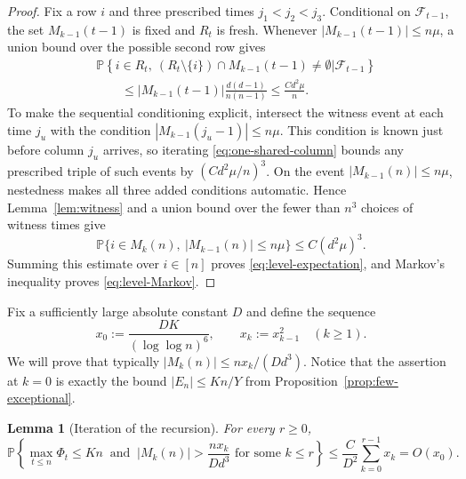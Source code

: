 \documentclass[reqno,english]{amsart}
\newcommand*{\PP}{\mathbb P}
\newcommand*{\calF}{\mathcal F}
\newtheorem{lemma}[lemma]{Lemma}
\theoremstyle{definition}
\begin{document}
\begin{proof}
Fix a row $i$ and three prescribed times $j_1<j_2<j_3$.  Conditional on
$\calF_{t-1}$, the set $M_{k-1}(t-1)$ is fixed and $R_t$ is fresh.  Whenever
$|M_{k-1}(t-1)|\le n\mu$, a union bound over the possible second row gives
\begin{align}\label{eq:one-shared-column}
 &\PP\left\{i\in R_t,\
   (R_t\setminus\{i\})\cap M_{k-1}(t-1)\ne\emptyset
   \mathrel{\Big|}\calF_{t-1}\right\}\nonumber\\
 &\qquad\le |M_{k-1}(t-1)|\frac{d(d-1)}{n(n-1)}
 \le\frac{Cd^2\mu}{n}.
\end{align}
To make the sequential conditioning explicit, intersect the witness event at
each time $j_u$ with the condition
$|M_{k-1}(j_u-1)|\le n\mu$.  This condition is known just before column
$j_u$ arrives, so iterating \eqref{eq:one-shared-column} bounds any prescribed
triple of such events by $(Cd^2\mu/n)^3$.  On the event
$|M_{k-1}(n)|\le n\mu$, nestedness makes all three added conditions automatic.
Hence Lemma~\ref{lem:witness} and a union bound over the fewer than $n^3$ choices
of witness times give
\begin{equation}\label{eq:single-row-level}
 \PP\{i\in M_k(n),\ |M_{k-1}(n)|\le n\mu\}
 \le C(d^2\mu)^3.
\end{equation}
Summing this estimate over $i\in[n]$ proves
\eqref{eq:level-expectation}, and Markov's inequality proves
\eqref{eq:level-Markov}.
\end{proof}

Fix a sufficiently large absolute constant $D$ and define {\color{black}the} sequence
\begin{equation}\label{eq:x-recursion}
 x_0:=\frac{DK}{(\log\log n)^6},
 \qquad
 x_k:=x_{k-1}^2\quad(k\ge1).
\end{equation}
We will prove that typically $|M_k(n)|\le n x_k/(Dd^3)$.  Notice that the assertion at
$k=0$ is exactly the bound $|E_n|\le Kn/Y$ from
Proposition~\ref{prop:few-exceptional}.

\begin{lemma}[Iteration of the recursion]\label{lem:iteration}
For every $r\ge0$,
\begin{equation}\label{eq:iteration-failure}
 \PP\left\{\max_{t\le n}\Phi_t\le Kn\ \text{ and }\
   |M_k(n)|>\frac{nx_k}{Dd^3}
   \text{ for some }k\le r\right\}
 \le\frac{C}{D^2}\sum_{k=0}^{r-1}x_k=O(x_0).
\end{equation}
\end{lemma}
\end{document}
